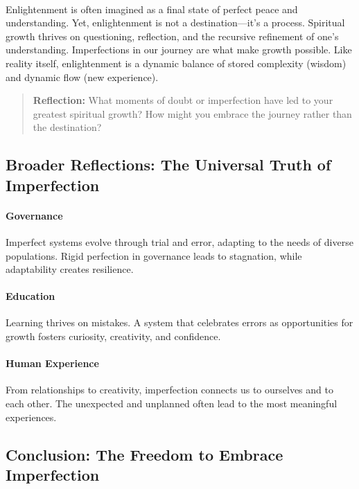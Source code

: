 \documentclass[12pt]{article}
\begin{document}
\paragraph{}
Enlightenment is often imagined as a final state of perfect peace and understanding. Yet, enlightenment is not a destination—it’s a process. Spiritual growth thrives on questioning, reflection, and the recursive refinement of one’s understanding. Imperfections in our journey are what make growth possible. Like reality itself, enlightenment is a dynamic balance of stored complexity (wisdom) and dynamic flow (new experience).

\begin{quote}
\textbf{Reflection:}  
What moments of doubt or imperfection have led to your greatest spiritual growth? How might you embrace the journey rather than the destination?
\end{quote}

\subsection*{Broader Reflections: The Universal Truth of Imperfection}

\paragraph{Governance} Imperfect systems evolve through trial and error, adapting to the needs of diverse populations. Rigid perfection in governance leads to stagnation, while adaptability creates resilience.

\paragraph{Education} Learning thrives on mistakes. A system that celebrates errors as opportunities for growth fosters curiosity, creativity, and confidence.

\paragraph{Human Experience} From relationships to creativity, imperfection connects us to ourselves and to each other. The unexpected and unplanned often lead to the most meaningful experiences.

\subsection*{Conclusion: The Freedom to Embrace Imperfection}
\end{document}
